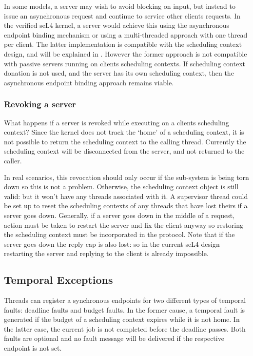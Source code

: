 In some models, a server may wish to avoid blocking on input, but instead to issue an asynchronous request and continue to service other clients requests.
In the verified seL4 kernel, a server would achieve this using the asynchronous endpoint binding mechanism or using a multi-threaded approach with one thread per client.
The latter implementation is compatible with the scheduling context design, and will be explained in .
However the former approach is not compatible with passive servers running on clients scheduling contexts.
If scheduling context donation is not used, and the server has its own scheduling context, then the asynchronous endpoint binding approach remains viable.

\subsubsection{Revoking a server}

What happens if a server is revoked while executing on a clients scheduling context?
Since the kernel does not track the `home' of a scheduling context, it is not possible to return the scheduling context to the calling thread.
Currently the scheduling context will be disconnected from the server, and not returned to the caller.

In real scenarios, this revocation should only occur if the sub-system is being torn down so this is not a problem.
Otherwise, the scheduling context object is still valid: but it won't have any threads associated with it.
A supervisor thread could be set up to reset the scheduling contexts of any threads that have lost theirs if a server goes down.
Generally, if a server goes down in the middle of a request, action must be taken to restart the server and fix the client anyway so restoring the scheduling context must be incorporated in the protocol.
Note that if the server goes down the reply cap is also lost: so in the current seL4 design restarting the server and replying to the client is already impossible.

\subsection{Temporal Exceptions}

Threads can register a synchronous endpoints for two different types of temporal faults: deadline faults and budget faults.
In the former cause, a temporal fault is generated if the budget of a scheduling context expires while it is not home.
In the latter case, the current job is not completed before the deadline passes.
Both faults are optional and no fault message will be delivered if the respective endpoint is not set.

